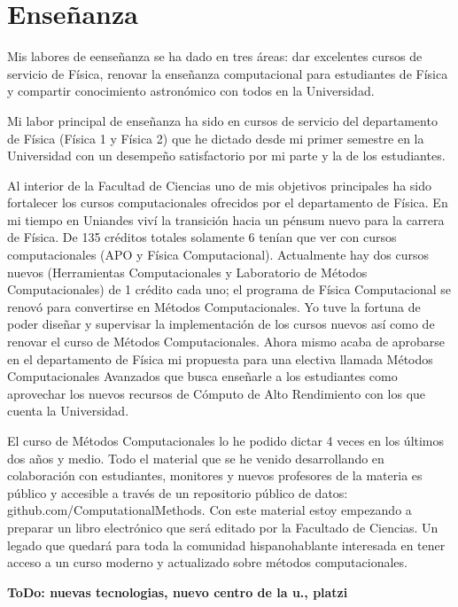 \documentclass[letterpaper,12pt,onecolumn]{article}
\begin{document}
\pagestyle{empty}
\section*{{\Large{\sc Ense\~nanza}}}

Mis labores de eense\~nanza se ha dado en tres \'areas: dar excelentes
cursos de servicio de F\'isica, renovar la ense\~nanza computacional
para estudiantes de F\'isica y compartir conocimiento astron\'omico
con todos en la Universidad.

Mi labor principal de ense\~nanza ha sido en cursos de servicio del
departamento de F\'isica (F\'isica 1 y F\'isica 2) que he dictado desde mi
primer semestre en la Universidad con un desempe\~no satisfactorio por
mi parte y la de los estudiantes.

Al interior de la Facultad de Ciencias uno de mis objetivos
principales ha sido fortalecer los cursos computacionales ofrecidos por
el departamento de F\'isica. En mi tiempo en Uniandes viv\'i la transici\'on
hacia un p\'ensum nuevo para la carrera de F\'isica. De 135 cr\'editos
totales solamente 6 ten\'ian que ver con cursos computacionales (APO y
F\'isica Computacional). Actualmente hay dos cursos nuevos (Herramientas
Computacionales y Laboratorio de M\'etodos Computacionales) de 1 cr\'edito
 cada uno; el programa de F\'isica Computacional se renov\'o para convertirse en
M\'etodos Computacionales. Yo tuve la fortuna de poder dise\~nar y
supervisar la implementaci\'on de los cursos nuevos as\'i como de renovar
el curso de M\'etodos  Computacionales. Ahora mismo acaba de aprobarse
en el departamento de F\'isica mi propuesta para una electiva llamada
M\'etodos Computacionales Avanzados que busca ense\~narle a los
estudiantes como aprovechar los nuevos  recursos de C\'omputo de Alto
Rendimiento con los que cuenta la Universidad.


El curso de M\'etodos Computacionales lo he podido dictar 4 veces en los
\'ultimos dos a\~nos y medio. Todo el material que se he venido
desarrollando en colaboraci\'on con estudiantes, monitores y nuevos
profesores de la materia es p\'ublico y accesible a trav\'es de un
repositorio p\'ublico de datos: github.com/ComputationalMethods.
Con este material estoy empezando a preparar un libro electr\'onico que
ser\'a editado por la Facultado de Ciencias. Un legado que quedar\'a para
toda la comunidad hispanohablante interesada en tener acceso a un
curso moderno y actualizado sobre m\'etodos computacionales.

{\bf ToDo: nuevas tecnologias, nuevo centro de la u., platzi}
\end{document}
